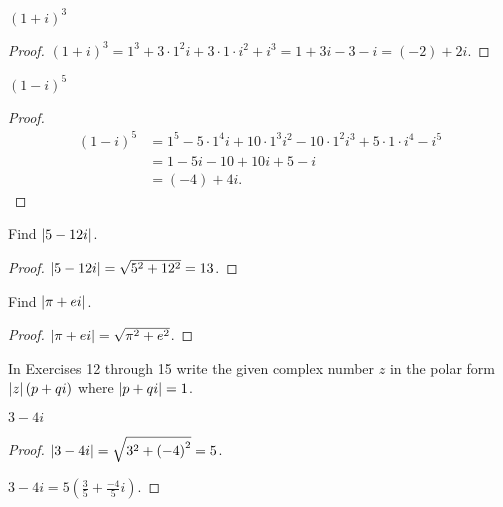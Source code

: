 \newpage
\begin{exercise}
    ${(1+i)}^{3}$
\end{exercise}

\begin{proof}
    ${(1+i)}^{3} = 1^{3} + 3\cdot 1^{2}i + 3\cdot 1\cdot i^{2} + i^{3} = 1 + 3i - 3 - i = (-2) + 2i$.
\end{proof}

\newpage
\begin{exercise}
    ${(1-i)}^{5}$
\end{exercise}

\begin{proof}
    \begin{align*}
        {(1-i)}^{5} & = 1^{5} - 5\cdot 1^{4}i + 10\cdot 1^{3}i^{2} - 10\cdot 1^{2}i^{3} + 5\cdot 1\cdot i^{4} - i^{5} \\
                    & = 1 - 5i - 10 + 10i + 5 - i                                                                     \\
                    & = (-4) + 4i.
    \end{align*}
\end{proof}

\newpage
\begin{exercise}
    Find $\left\vert{5 - 12i}\right\vert$.
\end{exercise}

\begin{proof}
    $\left\vert{5 - 12i}\right\vert = \sqrt{5^{2} + 12^{2}} = 13$.
\end{proof}

\newpage
\begin{exercise}
    Find $\left\vert{\pi + ei}\right\vert$.
\end{exercise}

\begin{proof}
    $\left\vert{\pi + ei}\right\vert = \sqrt{\pi^{2} + e^{2}}$.
\end{proof}

In Exercises 12 through 15 write the given complex number $z$ in the polar form $\left\vert{z}\right\vert(p + qi)$ where $\left\vert{p + qi}\right\vert = 1$.

\newpage
\begin{exercise}
    $3 - 4i$
\end{exercise}

\begin{proof}
    $\left\vert{3 - 4i}\right\vert = \sqrt{3^{2} + {(-4)}^{2}} = 5$.

    $3 - 4i = 5\left(\frac{3}{5} + \frac{-4}{5}i\right)$.
\end{proof}

